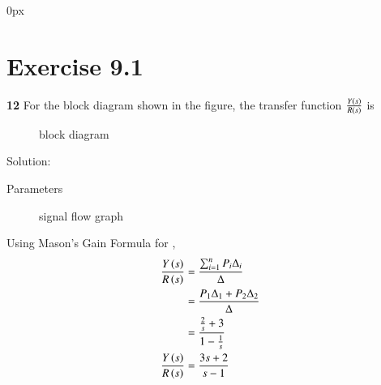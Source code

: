 \documentclass[journal,12pt,twocolumn]{IEEEtran}
\theoremstyle{remark}
\begin{document}
\parindent 0px


\vspace{3cm}

\title{}
\author{EE23BTECH11217 - Prajwal M$^{*}$
}
\maketitle
\newpage
\bigskip



\section*{Exercise 9.1}

\noindent \textbf{12} \hspace{2pt}For the block diagram shown in the figure, the transfer function $\frac{Y\left(s\right)}{R\left(s\right)}$ is \\
\begin{figure}[h]
    \centering
    
    \caption{block diagram}
    \label{fig:9.1.12.1}
\end{figure}

Solution:\\
\begin{table}[h]
    \centering
    
    \caption{Parameters}
    \label{tab:9.1.12.1}
\end{table}

\begin{figure}[h]
    \centering
    
    \caption{signal flow graph}
    \label{fig: 9.1.12.2}
\end{figure}

Using Mason's Gain Formula for ,
\begin{align}
    \frac{Y\left(s\right)}{R\left(s\right)} & = \frac{{\sum_{i=1}^{n} P_i\Delta_i}}{{\Delta}}\\
    & = \frac{P_1\Delta_1 + P_2\Delta_2}{\Delta}\\
    & = \frac{\frac{2}{s} + 3}{1 - \frac{1}{s}}\\
    \frac{Y\left(s\right)}{R\left(s\right)} & = \frac{3s+2}{s-1}
\end{align}
\end{document}
